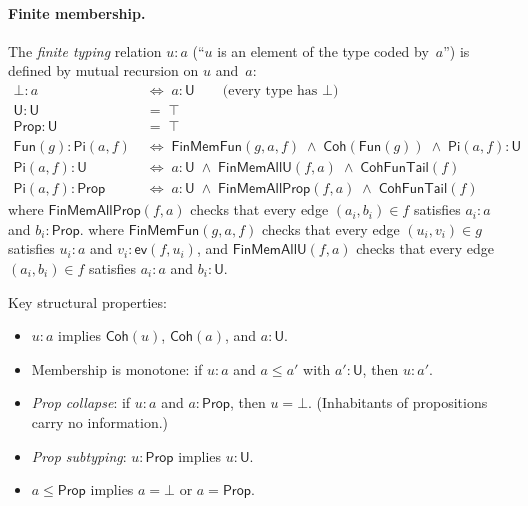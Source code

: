 \documentclass[11pt]{article}
\newcommand{\PropCode}{\mathsf{Prop}}
\newcommand{\Bot}{\bot}
\newcommand{\UCode}{\mathsf{U}}
\newcommand{\FunEl}[1]{\mathsf{Fun}(#1)}
\newcommand{\PiC}[2]{\mathsf{Pi}(#1,#2)}
\newcommand{\EvalFun}{\mathsf{ev}}
\newcommand{\LeCode}{\leq}
\newcommand{\Coh}{\mathsf{Coh}}
\newcommand{\FinMem}{\mathrel{:}}
\begin{document}
\paragraph{Finite membership.}
The \emph{finite typing} relation $u \FinMem a$ (``$u$ is an element
of the type coded by~$a$'') is defined by mutual recursion on
$u$ and~$a$:
\begin{align*}
  \Bot \FinMem a &\;\Longleftrightarrow\; a \FinMem \UCode
    \qquad\text{(every type has $\Bot$)} \\
  \UCode \FinMem \UCode &\;=\; \top \\
  \PropCode \FinMem \UCode &\;=\; \top \\
  \FunEl{g} \FinMem \PiC{a}{f}
    &\;\Longleftrightarrow\;
    \mathsf{FinMemFun}(g,a,f) \;\wedge\;
    \Coh(\FunEl{g}) \;\wedge\;
    \PiC{a}{f} \FinMem \UCode \\
  \PiC{a}{f} \FinMem \UCode
    &\;\Longleftrightarrow\;
    a \FinMem \UCode \;\wedge\;
    \mathsf{FinMemAllU}(f,a) \;\wedge\;
    \mathsf{CohFunTail}(f) \\
  \PiC{a}{f} \FinMem \PropCode
    &\;\Longleftrightarrow\;
    a \FinMem \UCode \;\wedge\;
    \mathsf{FinMemAllProp}(f,a) \;\wedge\;
    \mathsf{CohFunTail}(f)
\end{align*}
where $\mathsf{FinMemAllProp}(f,a)$ checks that every edge
$(a_i,b_i) \in f$ satisfies $a_i \FinMem a$ and $b_i \FinMem \PropCode$.
where $\mathsf{FinMemFun}(g,a,f)$ checks that every edge
$(u_i,v_i) \in g$ satisfies $u_i \FinMem a$ and
$v_i \FinMem \EvalFun(f, u_i)$,
and $\mathsf{FinMemAllU}(f,a)$ checks that every edge
$(a_i,b_i) \in f$ satisfies $a_i \FinMem a$ and $b_i \FinMem \UCode$.

Key structural properties:
\begin{itemize}
  \item $u \FinMem a$ implies $\Coh(u)$, $\Coh(a)$, and $a \FinMem \UCode$.
  \item Membership is monotone: if $u \FinMem a$ and $a \LeCode a'$
    with $a' \FinMem \UCode$, then $u \FinMem a'$.
  \item \emph{Prop collapse}: if $u \FinMem a$ and $a \FinMem \PropCode$,
    then $u = \Bot$.  (Inhabitants of propositions carry no information.)
  \item \emph{Prop subtyping}: $u \FinMem \PropCode$ implies $u \FinMem \UCode$.
  \item $a \LeCode \PropCode$ implies $a = \Bot$ or $a = \PropCode$.
\end{itemize}
\end{document}
